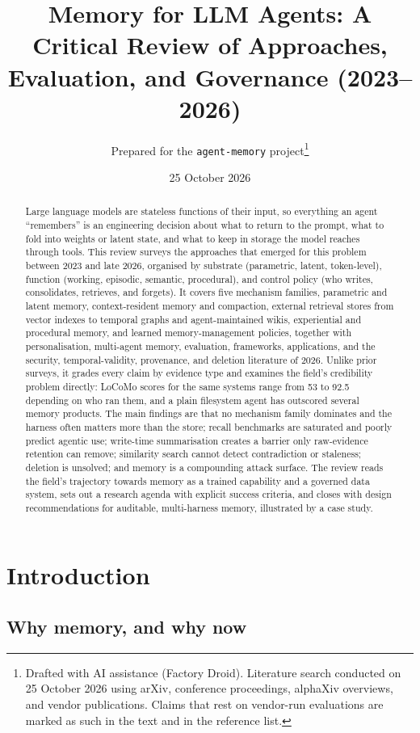 \documentclass[11pt]{article}
\title{\textbf{Memory for LLM Agents: A Critical Review of Approaches, Evaluation, and Governance (2023--2026)}}
\author{Prepared for the \texttt{agent-memory} project\thanks{Drafted with AI assistance (Factory Droid). Literature search conducted on 25 October 2026 using arXiv, conference proceedings, alphaXiv overviews, and vendor publications. Claims that rest on vendor-run evaluations are marked as such in the text and in the reference list.}}
\date{25 October 2026}
\begin{document}
\maketitle

\begin{abstract}
Large language models are stateless functions of their input, so everything an agent ``remembers'' is an engineering decision about what to return to the prompt, what to fold into weights or latent state, and what to keep in storage the model reaches through tools. This review surveys the approaches that emerged for this problem between 2023 and late 2026, organised by substrate (parametric, latent, token-level), function (working, episodic, semantic, procedural), and control policy (who writes, consolidates, retrieves, and forgets). It covers five mechanism families, parametric and latent memory, context-resident memory and compaction, external retrieval stores from vector indexes to temporal graphs and agent-maintained wikis, experiential and procedural memory, and learned memory-management policies, together with personalisation, multi-agent memory, evaluation, frameworks, applications, and the security, temporal-validity, provenance, and deletion literature of 2026. Unlike prior surveys, it grades every claim by evidence type and examines the field's credibility problem directly: LoCoMo scores for the same systems range from 53 to 92.5 depending on who ran them, and a plain filesystem agent has outscored several memory products. The main findings are that no mechanism family dominates and the harness often matters more than the store; recall benchmarks are saturated and poorly predict agentic use; write-time summarisation creates a barrier only raw-evidence retention can remove; similarity search cannot detect contradiction or staleness; deletion is unsolved; and memory is a compounding attack surface. The review reads the field's trajectory towards memory as a trained capability and a governed data system, sets out a research agenda with explicit success criteria, and closes with design recommendations for auditable, multi-harness memory, illustrated by a case study.
\end{abstract}

\section{Introduction}

\subsection{Why memory, and why now}
\end{document}

